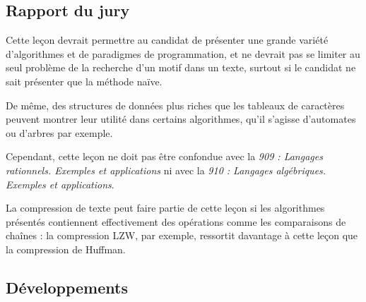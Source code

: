 \documentclass[../../agregation.tex]{subfiles}
\begin{document}

\subsection{Rapport du jury}

\begin{aquote}{}
Cette leçon devrait permettre au candidat de présenter une grande variété d'algorithmes et de paradigmes de programmation, et ne devrait pas se limiter au seul problème de la recherche d'un motif dans un texte, surtout si le candidat ne sait présenter que la méthode naïve.

De même, des structures de données plus riches que les tableaux de caractères peuvent montrer leur utilité dans certains algorithmes, qu'il s'agisse d'automates ou d'arbres par exemple.

Cependant, cette leçon ne doit pas être confondue avec la \emph{909 : Langages rationnels. Exemples et applications} ni avec la \emph{910 : Langages algébriques. Exemples et applications}.


La compression de texte peut faire partie de cette leçon si les algorithmes présentés contiennent effectivement des opérations comme les comparaisons de chaînes : la compression LZW, par exemple, ressortit davantage à cette leçon que la compression de Huffman.
\end{aquote}

\subsection{Développements}

\dvts
\end{document}
